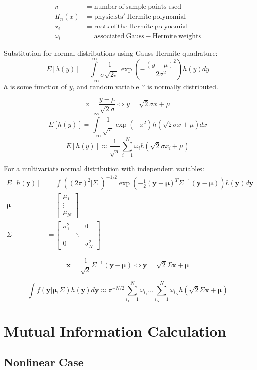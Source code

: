 \documentclass{article}         %
\theoremstyle{definition}
\theoremstyle{remark}
\newcommand{\eq}[1]{\begin{equation} #1 \end{equation}}
\newcommand{\eqsp}[1]{\begin{equation}\begin{split} #1 \end{split}\end{equation}}
\newcommand{\paren}[1]{\left(#1\right)}
\newcommand{\bracket}[1]{\left[#1\right]}
\newcommand{\arr}[2]{\begin{array}{#1} #2 \end{array}}
\newcommand{\brkarray}[2]{\bracket{\arr{#1}{#2}}}
\begin{document}
\eqsp{n&=\mathrm{number\ of\ sample\ points\ used}\\
	H_n(x)&=\mathrm{physicists'\ Hermite\ polynomial}\\
	x_i&=\mathrm{roots\ of\ the\ Hermite\ polynomial}\\
	\omega_i&=\mathrm{associated\ Gauss-Hermite\ weights}}

Substitution for normal distributions using Gauss-Hermite quadrature:
\eq{E[h(y)]=\int\limits_{-\infty}^{\infty}\frac{1}{\sigma\sqrt{2\pi}}\exp\left(-\frac{(y-\mu)^2}{2\sigma^2}\right)h(y)dy}
$h$ is some function of $y$, and random variable $Y$ is normally distributed.

\eq{x=\frac{y-\mu}{\sqrt{2}\sigma}\Leftrightarrow y=\sqrt{2}\sigma x+\mu}
\eq{E[h(y)]=\int\limits_{-\infty}^{\infty}\frac{1}{\sqrt{\pi}}\exp\left(-x^2\right)h\left(\sqrt{2}\sigma x+\mu\right)dx}
\eq{E[h(y)]\approx\frac{1}{\sqrt{\pi}}\sum\limits_{i=1}^N \omega_i h\left(\sqrt{2}\sigma x_i+\mu\right)}

For a multivariate normal distribution with independent variables:
\eqsp{E[h(\mathbf{y})]&=\int\paren{(2\pi)^2|\Sigma|}^{-1/2}\exp\paren{-\frac{1}{2}(\mathbf{y}-\mathbf{\mu})^T\Sigma^{-1}(\mathbf{y}-\mathbf{\mu})}h(\mathbf{y})d\mathbf{y}\\
	\mathbf{\mu}&=\brkarray{c}{\mu_1 \\ \vdots \\ \mu_N}\\
	\Sigma&=\brkarray{ccc}{\sigma_1^2 & & 0 \\ & \ddots & \\ 0 & & \sigma_N^2}}

\eq{\mathbf{x}=\frac{1}{\sqrt{2}}\Sigma^{-1}(\mathbf{y}-\mathbf{\mu})\Leftrightarrow\mathbf{y}=\sqrt{2}\Sigma\mathbf{x}+\mathbf{\mu}}

\eq{\int f(\mathbf{y}|\mathbf{\mu},\Sigma)h(\mathbf{y})d\mathbf{y}\approx\pi^{-N/2}\sum\limits_{i_1=1}^{N}\omega_{i_1}\hdots\sum\limits_{i_N=1}^{N}\omega_{i_N}h\paren{\sqrt{2}\Sigma\mathbf{x}+\mathbf{\mu}}}		
\section{Mutual Information Calculation}

\subsection{Nonlinear Case}
\end{document}
